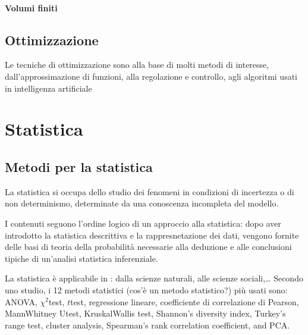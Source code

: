 \documentclass[letterpaper,10pt,italian]{jupyterBook}
\begin{document}
\subsection{Volumi finiti}
\label{\detokenize{ch/numerics/ode-boundary:volumi-finiti}}
\sphinxstepscope


\chapter{Ottimizzazione}
\label{\detokenize{ch/numerics/optimization:ottimizzazione}}\label{\detokenize{ch/numerics/optimization::doc}}
\sphinxAtStartPar
Le tecniche di ottimizzazione sono alla base di molti metodi di interesse, dall’approssimazione di funzioni, alla regolazione e controllo, agli algoritmi usati in intelligenza artificiale

\sphinxstepscope


\part{Statistica}

\sphinxstepscope


\chapter{Metodi per la statistica}
\label{\detokenize{ch/statistics:metodi-per-la-statistica}}\label{\detokenize{ch/statistics:book-statistics-hs}}\label{\detokenize{ch/statistics::doc}}
\sphinxAtStartPar
La statistica si occupa dello studio dei fenomeni in condizioni di incertezza o di non determinismo, determinate da una conoscenza incompleta del modello.

\sphinxAtStartPar
I contenuti seguono l’ordine logico di un approccio alla statistica: dopo aver introdotto la statistica descrittiva e la rappresnetazione dei dati, vengono fornite delle basi di teoria della probabilità necessarie alla deduzione e alle conclusioni tipiche di un’analisi statistica inferenziale.



\sphinxAtStartPar
La statistica è applicabile in : dalla scienze naturali, alle scienze sociali,…
Secondo uno studio, i 12 metodi statistici (cos’è un metodo statistico?) più usati sono: ANOVA, \(\chi^2\)\sphinxhyphen{}test, \(t\)\sphinxhyphen{}test, regressione lineare, coefficiente di correlazione di Pearson, Mann\sphinxhyphen{}Whitney U\sphinxhyphen{}test, Kruskal\sphinxhyphen{}Wallis test, Shannon’s diversity index, Turkey’s range test, cluster analysis, Spearman’s rank correlation coefficient, and PCA.
\end{document}
